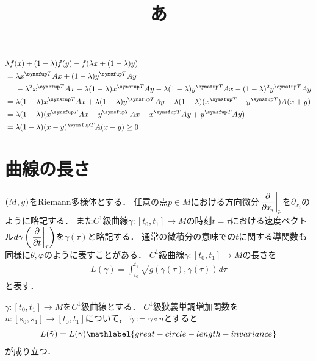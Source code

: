 \documentclass{ltjsarticle}
\title{あ}
\begin{document}
\begin{align*}
    & \lambda f (x) + (1 - \lambda) f(y) - f (\lambda x + (1 - \lambda) y) \\
    &= \lambda x^{\transpose}Ax + (1 - \lambda) y^{\transpose} A y \\
    &\mathrel{\hphantom{=}}{} - \lambda^2 x^{\transpose} A x  - \lambda (1 - \lambda) x^{\transpose} A y - \lambda (1 - \lambda) y^{\transpose} A x  - (1 - \lambda)^2 y^{\transpose} A y \\
    &=  \lambda(1 - \lambda)x^{\transpose} A x + \lambda (1 - \lambda) y^{\transpose} A y
     - \lambda (1 - \lambda) (x^{\transpose} + y^{\transpose}) A (x + y) \\
    &= \lambda (1 - \lambda)(x^{\transpose} A x - y^{\transpose} A x - x^{\transpose} Ay + y^{\transpose}Ay) \\
    &= \lambda(1 - \lambda)(x - y)^{\transpose} A (x - y) \geq 0
\end{align*}

\section{曲線の長さ}

\((M, g)\)をRiemann多様体とする．
任意の点\(p \in M\)における方向微分\(\displaystyle \left.\frac{\partial}{\partial x_i}\right\lvert_{p}\)を\(\partial_{x_i}\)のように略記する．
また\(C^1\)級曲線\(\gamma \colon [t_0, t_1] \to M\)の時刻\(t = \tau\)における速度ベクトル\(\displaystyle d\gamma\left(\left.\frac{\partial}{\partial t}\right\lvert_{\tau}\right)\)を\(\dot{\gamma}(\tau)\)と略記する．
通常の微積分の意味での\(t\)に関する導関数も同様に\(\dot{\theta}, \dot{\varphi}\)のように表すことがある．
\(C^1\)級曲線\(\gamma \colon [t_0, t_1] \to M\)の長さを
\begin{align*}
    L(\gamma) = \int_{t_0}^{t_1} \sqrt{g(\dot{\gamma}(\tau), \dot{\gamma}(\tau))} d\tau
\end{align*}
と表す．

\begin{thmbox}
\begin{proposition}
\(\gamma \colon [t_0, t_1] \to M\)を\(C^1\)級曲線とする．
\(C^1\)級狭義単調増加関数を\(u \colon [s_0, s_1] \to [t_0, t_1]\)について，
\(\tilde{\gamma} := \gamma \circ u\)とすると
\begin{align}
    L(\tilde{\gamma}) = L(\gamma)
    \mathlabel{great-circle-length-invariance}
\end{align}
が成り立つ．
\end{proposition}
\end{thmbox}
\end{document}
